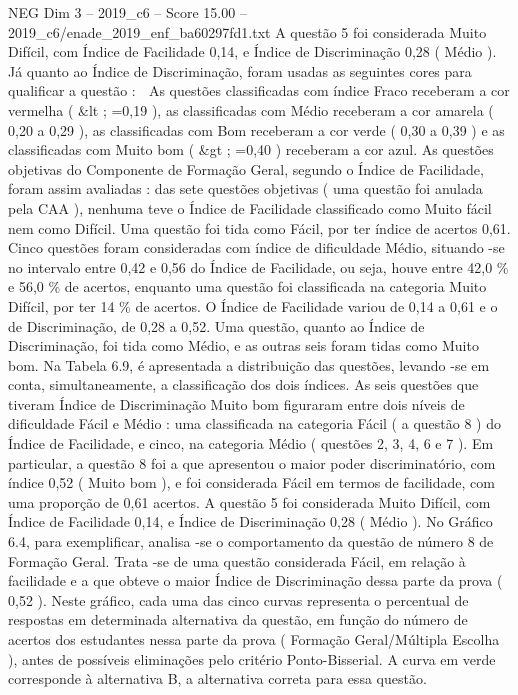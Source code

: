 \begin{textsample}{NEG Dim 3 – 2019\_c6 – Score 15.00 – 2019\_c6/enade\_2019\_enf\_ba60297fd1.txt}
A questão 5 foi considerada Muito Difícil, com Índice de Facilidade 0,14, e Índice de Discriminação 0,28 ( Médio ).
Já quanto ao Índice de Discriminação, foram usadas as seguintes cores para qualificar a questão :  As questões classificadas com índice Fraco receberam a cor vermelha ( \&lt ; =0,19 ), as classificadas com Médio receberam a cor amarela ( 0,20 a 0,29 ), as classificadas com Bom receberam a cor verde ( 0,30 a 0,39 ) e as classificadas com Muito bom ( \&gt ; =0,40 ) receberam a cor azul.
As questões objetivas do Componente de Formação Geral, segundo o Índice de Facilidade, foram assim avaliadas : das sete questões objetivas ( uma questão foi anulada pela CAA ), nenhuma teve o Índice de Facilidade classificado como Muito fácil nem como Difícil.
Uma questão foi tida como Fácil, por ter índice de acertos 0,61.
Cinco questões foram consideradas com índice de dificuldade Médio, situando -se no intervalo entre 0,42 e 0,56 do Índice de Facilidade, ou seja, houve entre 42,0 \% e 56,0 \% de acertos, enquanto uma questão foi classificada na categoria Muito Difícil, por ter 14 \% de acertos.
O Índice de Facilidade variou de 0,14 a 0,61 e o de Discriminação, de 0,28 a 0,52.
Uma questão, quanto ao Índice de Discriminação, foi tida como Médio, e as outras seis foram tidas como Muito bom.
Na Tabela 6.9, é apresentada a distribuição das questões, levando -se em conta, simultaneamente, a classificação dos dois índices.
As seis questões que tiveram Índice de Discriminação Muito bom figuraram entre dois níveis de dificuldade Fácil e Médio : uma classificada na categoria Fácil ( a questão 8 ) do Índice de Facilidade, e cinco, na categoria Médio ( questões 2, 3, 4, 6 e 7 ).
Em particular, a questão 8 foi a que apresentou o maior poder discriminatório, com índice 0,52 ( Muito bom ), e foi considerada Fácil em termos de facilidade, com uma proporção de 0,61 acertos.
A questão 5 foi considerada Muito Difícil, com Índice de Facilidade 0,14, e Índice de Discriminação 0,28 ( Médio ).
No Gráfico 6.4, para exemplificar, analisa -se o comportamento da questão de número 8 de Formação Geral.
Trata -se de uma questão considerada Fácil, em relação à facilidade e a que obteve o maior Índice de Discriminação dessa parte da prova ( 0,52 ).
Neste gráfico, cada uma das cinco curvas representa o percentual de respostas em determinada alternativa da questão, em função do número de acertos dos estudantes nessa parte da prova ( Formação Geral/Múltipla Escolha ), antes de possíveis eliminações pelo critério Ponto-Bisserial.
A curva em verde corresponde à alternativa B, a alternativa correta para essa questão.

\end{textsample}
